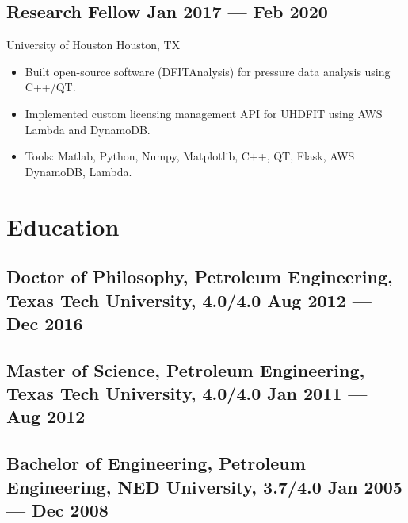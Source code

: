 \documentclass[letter,10pt]{article}
\newcommand{\subtext}[1]{
	#1\par\vspace{-0.2cm}}
\newenvironment{zitemize}{
	\begin{itemize}\itemsep0pt \parskip0pt \parsep1pt}
	{\end{itemize}\vspace{-0.5cm}}
\begin{document}
	\vspace{0.3 cm}
	\subsection*{Research Fellow \hfill Jan 2017 --- Feb 2020} 
	\subtext{University of Houston \hfill Houston, TX} 
	\begin{zitemize}
		\item Built open-source software (DFITAnalysis) for pressure data analysis using C++/QT.
		\item Implemented custom licensing management API for UHDFIT using AWS Lambda and DynamoDB.
		\item Tools: Matlab, Python, Numpy, Matplotlib, C++, QT, Flask, AWS DynamoDB, Lambda.
	\end{zitemize}
	
	
	
	\section{Education }
	\subsection*{Doctor of Philosophy, Petroleum Engineering, {\normalsize \normalfont Texas Tech University, 4.0/4.0} \hfill Aug 2012 --- Dec 2016} 
	\vspace{0.1cm}
	\subsection*{Master of Science, Petroleum Engineering, {\normalsize \normalfont Texas Tech University, 4.0/4.0} \hfill Jan 2011 --- Aug 2012} 
	\vspace{0.1cm}
	\subsection*{Bachelor of Engineering, Petroleum Engineering, {\normalsize \normalfont NED University, 3.7/4.0} \hfill Jan 2005 --- Dec 2008} 
	\vspace{0.2cm}
	

	
\end{document}
